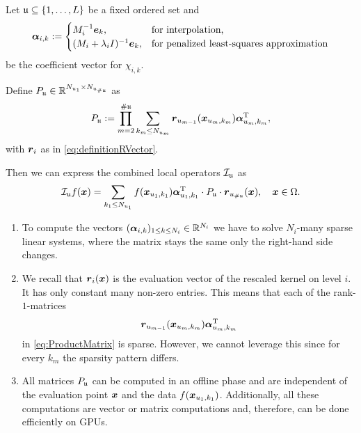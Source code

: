 \documentclass[	a4paper, 
								11pt]{article}
\theoremstyle{plain}
\begin{document}
\begin{lemma}\label{lem:CombinedOperatorNewRepresentation}
Let $ \mathfrak{u} \subseteq \{1, \dots, L \} $ be a fixed ordered set and 
 \begin{align*}
  \boldsymbol{\alpha}_{i,k} := \begin{cases} 
				  M_i^{-1} \boldsymbol{e}_k, &\text{for interpolation,} \\
                  (M_i + \lambda_i I)^{-1} \boldsymbol{e}_k, &\text{for penalized least-squares approximation}
                 \end{cases}
 \end{align*}
be the coefficient vector for $ \chi_{i,k} $.

Define $ P_{\mathfrak{u}} \in  \mathbb{R}^{N_{u_1} \times N_{u_{\#\mathfrak{u}}}} $ as
 \begin{align}\label{eq:ProductMatrix}
 P_{\mathfrak{u}} := \prod_{m=2}^{\#\mathfrak{u}} \sum_{k_m \leq N_{u_m}} \boldsymbol{r}_{
 u_{m-1}}(\boldsymbol{x}_{u_m,k_m}) \boldsymbol{\alpha}^{\text{T}}_{u_m,k_m},
 \end{align}
with $ \boldsymbol{r}_i $ as in \eqref{eq:definitionRVector}.

 Then we can express the combined local operators $ \mathcal{I}_{\mathfrak{u}} $ as 
 \begin{align*}
  \mathcal{I}_{\mathfrak{u}}f(\boldsymbol{x}) = \sum_{k_1 \leq N_{u_1}} f(\boldsymbol{x}_{u_1, k_1}) \boldsymbol{\alpha}
  ^{\text{T}}_{u_1,k_1} \cdot P_{\mathfrak{u}} \cdot \boldsymbol{r}_{u_{\# \mathfrak{u}}}(\boldsymbol{x}),
  \quad \boldsymbol{x} \in \Omega.
 \end{align*}
\end{lemma}

\begin{remark}\label{rem:FirstComputationalCost}
 \begin{enumerate}
 \item To compute the vectors $ (\boldsymbol{\alpha}_{i,k})_{1 \leq k \leq N_i} \in 
 \mathbb{R}^{N_i} $ we have to solve $ N_i $-many sparse linear systems, where the
 matrix stays the same only the right-hand side changes.
  \item We recall that $ \boldsymbol{r}_i (\boldsymbol{x}) $ is the evaluation vector of the rescaled 
  kernel on level $ i $. It has only constant many non-zero entries. This means that each of the rank-$ 1 $-matrices 
  \begin{align*}
   \boldsymbol{r}_{u_{m-1}}(\boldsymbol{x}_{u_m,k_m}) \boldsymbol{\alpha}^{\text{T}}_{u_m,k_m}
  \end{align*}
  in \eqref{eq:ProductMatrix} is sparse. However, we cannot leverage this since for every $ k_m $ the sparsity pattern differs.
   \item All matrices $ P_{\mathfrak{u}} $ can be computed in an offline phase and are 
 independent of the evaluation point $ \boldsymbol{x} $ and the data 
 $ f(\boldsymbol{x}_{u_1,k_1}) $. Additionally, all these computations are vector or matrix computations and, therefore, can be done efficiently on GPUs.
 \end{enumerate}
\end{remark}
\end{document}
